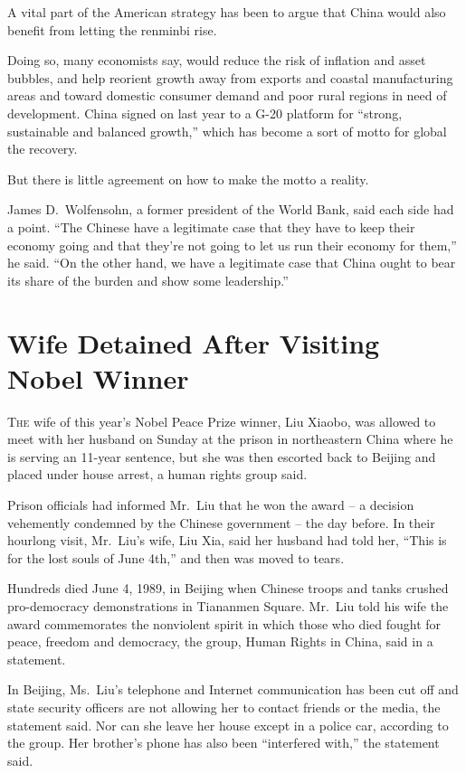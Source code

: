 ﻿\documentclass[12pt]{article}
\begin{document}
A vital part of the American strategy has been to argue that China would also benefit from letting
the renminbi rise.

Doing so, many economists say, would reduce the risk of inflation and asset bubbles, and help
reorient growth away from exports and coastal manufacturing areas and toward domestic consumer
demand and poor rural regions in need of development. China signed on last year to a G-20 platform
for ``strong, sustainable and balanced growth,'' which has become a sort of motto for global the
recovery.

But there is little agreement on how to make the motto a reality.

James D.~Wolfensohn, a former president of the World Bank, said each side had a point. ``The Chinese
have a legitimate case that they have to keep their economy going and that they're not going to let
us run their economy for them,'' he said. ``On the other hand, we have a legitimate case that China
ought to bear its share of the burden and show some leadership.''

\section{Wife Detained After Visiting Nobel Winner}

\lettrine{T}{he} wife of this year's Nobel Peace Prize winner, Liu Xiaobo,
was allowed to meet with her husband on Sunday at the prison in northeastern China where he is
serving an 11-year sentence, but she was then escorted back to Beijing and placed under house
arrest, a human rights group said.

Prison officials had informed Mr.~Liu that he won the award -- a decision vehemently condemned by
the Chinese government -- the day before. In their hourlong visit, Mr.~Liu's wife, Liu Xia, said her
husband had told her, ``This is for the lost souls of June 4th,'' and then was moved to tears.

Hundreds died June 4, 1989, in Beijing when Chinese troops and tanks crushed pro-democracy
demonstrations in Tiananmen Square. Mr.~Liu told his wife the award commemorates the nonviolent
spirit in which those who died fought for peace, freedom and democracy, the group, Human Rights in
China, said in a statement.

In Beijing, Ms.~Liu's telephone and Internet communication has been cut off and state security
officers are not allowing her to contact friends or the media, the statement said. Nor can she leave
her house except in a police car, according to the group. Her brother's phone has also been
``interfered with,'' the statement said.
\end{document}
